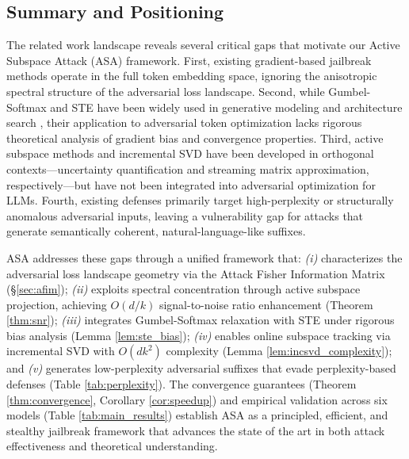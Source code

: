 ﻿\documentclass[lettersize,journal]{IEEEtran}
\begin{document}
\subsection{Summary and Positioning}
\label{sec:rw_positioning}

The related work landscape reveals several critical gaps that motivate our Active Subspace Attack (ASA) framework. First, existing gradient-based jailbreak methods \cite{zou2023universal, jia2024improved} operate in the full token embedding space, ignoring the anisotropic spectral structure of the adversarial loss landscape. Second, while Gumbel-Softmax and STE have been widely used in generative modeling and architecture search \cite{jang2017categorical, bengio2013estimating}, their application to adversarial token optimization lacks rigorous theoretical analysis of gradient bias and convergence properties. Third, active subspace methods \cite{constantine2014active} and incremental SVD \cite{brand2002incremental} have been developed in orthogonal contexts---uncertainty quantification and streaming matrix approximation, respectively---but have not been integrated into adversarial optimization for LLMs. Fourth, existing defenses \cite{robey2023smoothllm, xie2024gradsafe} primarily target high-perplexity or structurally anomalous adversarial inputs, leaving a vulnerability gap for attacks that generate semantically coherent, natural-language-like suffixes.

ASA addresses these gaps through a unified framework that: \textit{(i)} characterizes the adversarial loss landscape geometry via the Attack Fisher Information Matrix (\S\ref{sec:afim}); \textit{(ii)} exploits spectral concentration through active subspace projection, achieving $O(d/k)$ signal-to-noise ratio enhancement (Theorem \ref{thm:snr}); \textit{(iii)} integrates Gumbel-Softmax relaxation with STE under rigorous bias analysis (Lemma \ref{lem:ste_bias}); \textit{(iv)} enables online subspace tracking via incremental SVD with $O(dk^2)$ complexity (Lemma \ref{lem:incsvd_complexity}); and \textit{(v)} generates low-perplexity adversarial suffixes that evade perplexity-based defenses (Table \ref{tab:perplexity}). The convergence guarantees (Theorem \ref{thm:convergence}, Corollary \ref{cor:speedup}) and empirical validation across six models (Table \ref{tab:main_results}) establish ASA as a principled, efficient, and stealthy jailbreak framework that advances the state of the art in both attack effectiveness and theoretical understanding.


\end{document}
